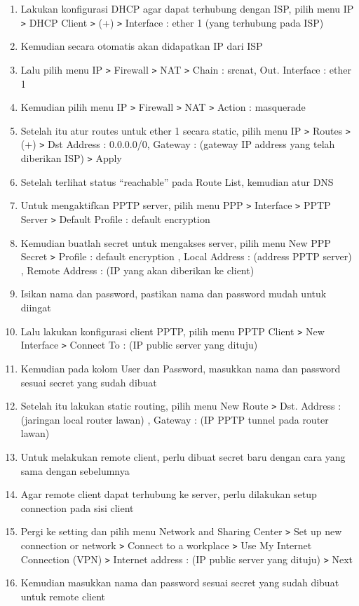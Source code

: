 \begin{enumerate}
    \item Lakukan konfigurasi DHCP agar dapat terhubung dengan ISP, pilih menu IP \texttt{\text>} DHCP Client \texttt{\text>} (+) \texttt{\text>} Interface : ether 1 (yang terhubung pada ISP)
    \item Kemudian secara otomatis akan didapatkan IP dari ISP
    \item Lalu pilih menu IP \texttt{\text>} Firewall \texttt{\text>} NAT \texttt{\text>} Chain : srcnat, Out. Interface : ether 1
    \item Kemudian pilih menu IP \texttt{\text>} Firewall \texttt{\text>} NAT \texttt{\text>} Action : masquerade
    \item Setelah itu atur routes untuk ether 1 secara static, pilih menu IP \texttt{\text>} Routes \texttt{\text>} (+) \texttt{\text>} Dst Address : 0.0.0.0/0, Gateway : (gateway IP address yang telah diberikan ISP) \texttt{\text>} Apply
    \item Setelah terlihat status “reachable” pada Route List, kemudian atur DNS
    \item Untuk mengaktifkan PPTP server, pilih menu PPP \texttt{\text>} Interface \texttt{\text>} PPTP Server \texttt{\text>} Default Profile : default encryption
    \item Kemudian buatlah secret untuk mengakses server, pilih menu New PPP Secret \texttt{\text>} Profile : default encryption , Local Address : (address PPTP server) , Remote Address : (IP yang akan diberikan ke client)
    \item Isikan nama dan password, pastikan nama dan password mudah untuk diingat
    \item Lalu lakukan konfigurasi client PPTP, pilih menu PPTP Client \texttt{\text>} New Interface \texttt{\text>} Connect To : (IP public server yang dituju)
    \item Kemudian pada kolom User dan Password, masukkan nama dan password sesuai secret yang sudah dibuat
    \item Setelah itu lakukan static routing, pilih menu New Route \texttt{\text>} Dst. Address : (jaringan local router lawan) , Gateway : (IP PPTP tunnel pada router lawan)
    \item Untuk melakukan remote client, perlu dibuat secret baru dengan cara yang sama dengan sebelumnya
    \item Agar remote client dapat terhubung ke server, perlu dilakukan setup connection pada sisi client
    \item Pergi ke setting dan pilih menu Network and Sharing Center \texttt{\text>} Set up new connection or network \texttt{\text>} Connect to a workplace \texttt{\text>} Use My Internet Connection (VPN) \texttt{\text>} Internet address : (IP public server yang dituju) \texttt{\text>} Next
    \item Kemudian masukkan nama dan password sesuai secret yang sudah dibuat untuk remote client
    
\end{enumerate}

